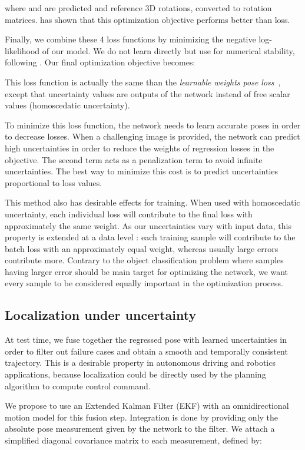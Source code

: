 \documentclass[10pt,twocolumn,letterpaper]{article}
\begin{document}
where  and  are predicted and reference 3D rotations, converted to rotation matrices. \cite{rotation_continuity} has shown that this optimization objective performs better than  loss.

Finally, we combine these 4 loss functions by minimizing the negative log-likelihood of our model. We do not learn  directly but use  for numerical stability, following \cite{geometric_loss_function}. Our final optimization objective becomes:


This loss function is actually the same than the \textit{learnable weights pose loss}~\cite{geometric_loss_function}, except that uncertainty values are outputs of the network instead of free scalar values (homoscedatic uncertainty).

To minimize this loss function, the network needs to learn accurate poses in order to decrease  losses. When a challenging image is provided, the network can predict high uncertainties in order to reduce the weights of regression losses in the objective. The second term acts as a penalization term to avoid infinite uncertainties. The best way to minimize this cost is to predict uncertainties proportional to loss values. 

This method also has desirable effects for training. When used with homoscedatic uncertainty, each individual loss will contribute to the final loss with approximately the same weight. As our uncertainties vary with input data, this property is extended at a data level : each training sample will contribute to the batch loss with an approximately equal weight, whereas usually large errors contribute more. 
Contrary to the object classification problem where samples having larger error should be main target for optimizing the network, we want every sample to be considered equally important in the optimization process.

\subsection{Localization under uncertainty}
\label{locunderuncertainty}

At test time, we fuse together the regressed pose with learned uncertainties in order to filter out failure cases and obtain a smooth and temporally consistent trajectory. This is a desirable property in autonomous driving and robotics applications, because localization could be directly used by the planning algorithm to compute control command.

We propose to use an Extended Kalman Filter (EKF) with an omnidirectional motion model for this fusion step. Integration is done by providing only the absolute pose measurement given by the network to the filter. We attach a simplified diagonal covariance matrix  to each measurement, defined by:
\end{document}
